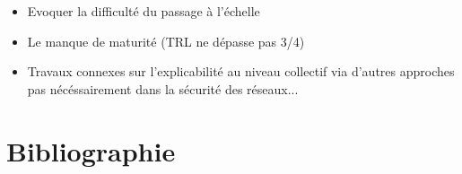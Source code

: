 \documentclass[runningheads]{llncs}
\begin{document}
\begin{itemize}

    \item Evoquer la difficulté du passage à l'échelle
    \item Le manque de maturité (TRL ne dépasse pas 3/4)
    \item Travaux connexes sur l'explicabilité au niveau collectif via d'autres approches pas nécéssairement dans la sécurité des réseaux...
\end{itemize}

\section{Bibliographie}
\end{document}
